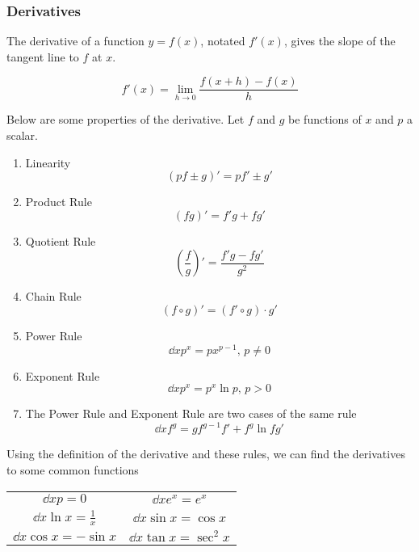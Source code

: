 \subsubsection{Derivatives}
The derivative of a function $y = f(x)$, notated $f'(x)$, gives the slope of the tangent line to $f$ at $x$.
\begin{definition}
	\begin{equation*}
		f'(x) = \lim\limits_{h \to 0}{\frac{f(x+h) - f(x)}{h}}
	\end{equation*}
\end{definition}

\noindent
Below are some properties of the derivative. Let $f$ and $g$ be functions of $x$ and $p$ a scalar.
\begin{enumerate}[label=]
	\item Linearity
	\begin{equation*}
		\left( pf \pm g \right)' = pf' \pm g'
	\end{equation*}
	\item Product Rule
	\begin{equation*}
		\left( fg \right)' = f'g + fg'
	\end{equation*}
	\item Quotient Rule
	\begin{equation*}
		\left( \frac{f}{g} \right)' = \frac{f'g - fg'}{g^2}
	\end{equation*}
	\item Chain Rule
	\begin{equation*}
		\left( f \circ g \right)' = \left( f' \circ g \right) \cdot g'
	\end{equation*}
	\item Power Rule
	\begin{equation*}
		\dd{x} p^x = px^{p-1} \text{, } p \neq 0
	\end{equation*}
	\item Exponent Rule
	\begin{equation*}
		\dd{x} p^x = p^x \ln{p} \text{, } p > 0
	\end{equation*}
	\item The Power Rule and Exponent Rule are two cases of the same rule
	\begin{equation*}
		\dd{x} f^g = gf^{g-1}f' + f^g\ln{f}g'
	\end{equation*}
\end{enumerate}
Using the definition of the derivative and these rules, we can find the derivatives to some common functions\\
\begin{center}
	\begin{tabular}{c | c}
		\large{$\dd{}{x} p = 0$} 				& \large{$\dd{}{x} e^x = e^x$} 			\\ [0.75em]
		\large{$\dd{}{x} \ln{x} = \frac{1}{x}$} & \large{$\dd{}{x} \sin{x} = \cos{x}$} 	\\ [0.75em]
		\large{$\dd{}{x} \cos{x} = -\sin{x}$} 	& \large{$\dd{}{x} \tan{x} = \sec^2{x}$}
	\end{tabular}
\end{center}
